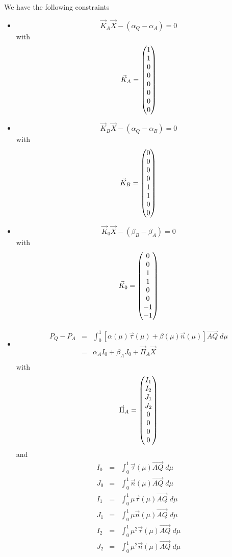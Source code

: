\documentclass[11pt]{amsart}
\newcommand{\myvec}[1]{\overrightarrow{#1}}
\begin{document}
We have the following constraints
\begin{itemize}
	\item
	\[
		\vec{K}_A\vec{X} - \left(\alpha_Q-\alpha_A\right) = 0
	\]
	with
	\[\vec{K}_A=\begin{pmatrix}1\cr 1\cr 0\cr 0\cr 0\cr 0\cr 0\cr 0\end{pmatrix}\]
	
	\item
	\[
		\vec{K}_B\vec{X} - \left(\alpha_Q-\alpha_B\right) = 0
	\]
	with
	\[\vec{K}_B=\begin{pmatrix}0\cr 0\cr 0\cr 0\cr 1\cr 1\cr 0\cr 0\end{pmatrix}\]
	
	\item
	\[
		\vec{K}_0\vec{X} - \left(\beta_B - \beta_A\right) = 0
	\]
	with
	\[\vec{K}_0=\begin{pmatrix}0\cr 0\cr 1\cr 1\cr 0\cr 0\cr -1\cr -1\end{pmatrix}\]
	
	\item
	\[
	\begin{array}{rcl}
		P_Q - P_A & = & \displaystyle\int_0^1 
	\left[ \alpha(\mu)\vec{\tau}(\mu) + \beta(\mu) \vec{n}(\mu)\right]\myvec{AQ} \; d\mu \\
	& = & \alpha_A I_0 + \beta_A J_0 + \vec{\Pi}_A \vec{X}\\
	\end{array}
	\]
	with
	\[
		\vec{\Pi}_A =
		\begin{pmatrix}
			I_1\cr
			I_2\cr
			J_1\cr
			J_2\cr
			0\cr
			0\cr
			0\cr
			0\cr
		\end{pmatrix}
	\]
	and
	\[
		\begin{array}{rcl}
		I_0 & = & \int_0^1 \vec{\tau}(\mu)\myvec{AQ}\;d\mu\\
		J_0 & = & \int_0^1 \vec{n}(\mu)\myvec{AQ}\;d\mu\\
		I_1 & = & \int_0^1 \mu\vec{\tau}(\mu)\myvec{AQ}\;d\mu\\
		J_1 & = & \int_0^1 \mu\vec{n}(\mu)\myvec{AQ}\;d\mu\\
		I_2 & = & \int_0^1 \mu^2\vec{\tau}(\mu)\myvec{AQ}\;d\mu\\
		J_2 & = & \int_0^1 \mu^2\vec{n}(\mu)\myvec{AQ}\;d\mu\\
		\end{array}
	\]
	

\end{itemize}
\end{document}
